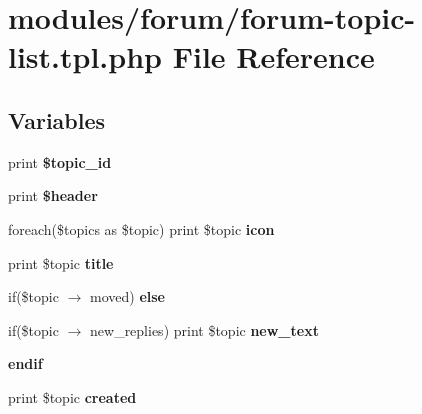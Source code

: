 \hypertarget{forum-topic-list_8tpl_8php}{
\section{modules/forum/forum-topic-list.tpl.php File Reference}
\label{forum-topic-list_8tpl_8php}
}
\subsection*{Variables}
\begin{CompactItemize}
\item 
\hypertarget{forum-topic-list_8tpl_8php_d63adef8ed61a62f2c83572cd6273445}{
print \textbf{\$topic\_\-id}}
\label{forum-topic-list_8tpl_8php_d63adef8ed61a62f2c83572cd6273445}

\item 
\hypertarget{forum-topic-list_8tpl_8php_fdbae16fe43949b38217397064ddaf03}{
print \textbf{\$header}}
\label{forum-topic-list_8tpl_8php_fdbae16fe43949b38217397064ddaf03}

\item 
\hypertarget{forum-topic-list_8tpl_8php_77e5d07abebe3261741e5786016785e0}{
foreach(\$topics as \$topic) print \$topic \textbf{icon}}
\label{forum-topic-list_8tpl_8php_77e5d07abebe3261741e5786016785e0}

\item 
\hypertarget{forum-topic-list_8tpl_8php_72edd12ee8bba1e113c562a074d20bfd}{
print \$topic \textbf{title}}
\label{forum-topic-list_8tpl_8php_72edd12ee8bba1e113c562a074d20bfd}

\item 
\hypertarget{forum-topic-list_8tpl_8php_03febd59c2d78f68da28db70f0873f2b}{
if(\$topic $\rightarrow$ moved) \textbf{else}}
\label{forum-topic-list_8tpl_8php_03febd59c2d78f68da28db70f0873f2b}

\item 
\hypertarget{forum-topic-list_8tpl_8php_32a751e033725f54390f66ac625aaf99}{
if(\$topic $\rightarrow$ new\_\-replies) print \$topic \textbf{new\_\-text}}
\label{forum-topic-list_8tpl_8php_32a751e033725f54390f66ac625aaf99}

\item 
\hypertarget{forum-topic-list_8tpl_8php_82cd33ca97ff99f2fcc5e9c81d65251b}{
\textbf{endif}}
\label{forum-topic-list_8tpl_8php_82cd33ca97ff99f2fcc5e9c81d65251b}

\item 
\hypertarget{forum-topic-list_8tpl_8php_ef00d19b024cca51c2589602fd667f2e}{
print \$topic \textbf{created}}
\label{forum-topic-list_8tpl_8php_ef00d19b024cca51c2589602fd667f2e}


\end{CompactItemize}
